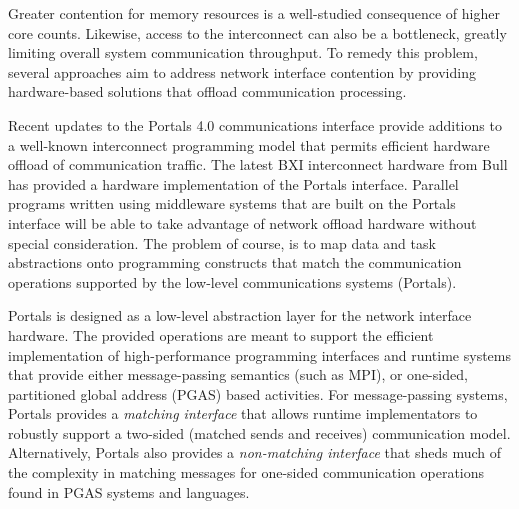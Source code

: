 %



Greater contention for memory resources is a well-studied
consequence of higher core counts. Likewise, access to the
interconnect can also be a bottleneck, greatly limiting overall system
communication throughput. To remedy this problem, several approaches
aim to address network interface contention by providing
hardware-based solutions that offload communication
processing. 

Recent updates to the Portals 4.0 communications interface provide
additions to a well-known interconnect programming model that permits
efficient hardware offload of communication traffic. The latest BXI
interconnect hardware from Bull has provided a hardware implementation
of the Portals interface.  Parallel programs written using middleware
systems that are built on the Portals interface will be able to take
advantage of network offload hardware without special consideration. 
The problem of course, is to map data and task abstractions onto
programming constructs that match the communication operations
supported by the low-level communications systems (Portals). 

Portals is designed as a low-level abstraction layer for the network
interface hardware. The provided operations are meant to support the
efficient implementation of high-performance programming interfaces
and runtime systems that provide either message-passing semantics
(such as MPI), or one-sided, partitioned global address (PGAS) based
activities. For message-passing systems, Portals provides a {\em
  matching interface} that allows runtime implementators to robustly
support a two-sided (matched sends and receives) communication
model. Alternatively, Portals also provides a {\em non-matching
  interface} that sheds much of the complexity in matching messages
for one-sided communication operations found in PGAS systems and
languages.

